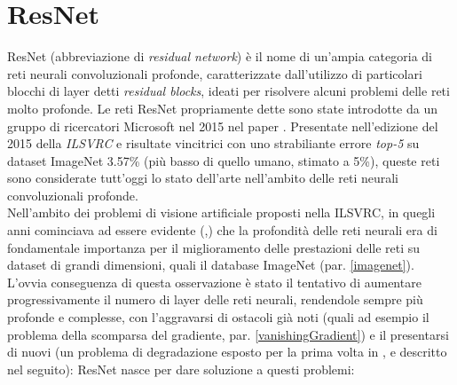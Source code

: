 \section{ResNet}
\label{resnet}
ResNet (abbreviazione di \textit{residual network}) è il nome di un'ampia categoria di reti neurali convoluzionali profonde, caratterizzate dall'utilizzo di particolari blocchi di layer detti \textit{residual blocks}, ideati per risolvere alcuni problemi delle reti molto profonde.
Le reti ResNet propriamente dette sono state introdotte da un gruppo di ricercatori Microsoft nel 2015 nel paper \cite{resnet}. Presentate nell'edizione del 2015 della \textit{ILSVRC} e risultate vincitrici con uno strabiliante errore \textit{top-5} su dataset ImageNet 3.57\% (più basso di quello umano, stimato a 5\%), queste reti sono considerate tutt'oggi lo stato dell'arte nell'ambito delle reti neurali convoluzionali profonde.\\

Nell'ambito dei problemi di visione artificiale proposti nella ILSVRC, in quegli anni cominciava ad essere evidente (\cite{googlenet},\cite{verydeep}) che la profondità delle reti neurali era di fondamentale importanza per il miglioramento delle prestazioni delle reti su dataset di grandi dimensioni, quali il database ImageNet (par. \ref{imagenet}).
L'ovvia conseguenza di questa osservazione è stato il tentativo di aumentare progressivamente il numero di layer delle reti neurali, rendendole sempre più profonde e complesse, con l'aggravarsi di ostacoli già noti (quali ad esempio il problema della scomparsa del gradiente, par. \ref{vanishingGradient}) e il presentarsi di nuovi (un problema di degradazione esposto per la prima volta in \cite{highway}, e descritto nel seguito):
ResNet nasce per dare soluzione a questi problemi:

